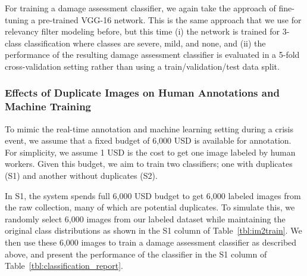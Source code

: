 \documentclass{iscram}
\begin{document}
For training a damage assessment classifier, we again take the approach of fine-tuning a pre-trained VGG-16 network. This is the same approach that we use for relevancy filter modeling before, but this time (i) the network is trained for 3-class classification where classes are severe, mild, and none, and (ii) the performance of the resulting damage assessment classifier is evaluated in a 5-fold cross-validation setting rather than using a train/validation/test data split.

\subsubsection{Effects of Duplicate Images on Human Annotations and Machine Training}%
To mimic the real-time annotation and machine learning setting during a crisis event, we assume that a fixed budget of 6,000 USD is available for annotation. For simplicity, we assume 1 USD is the cost to get one image labeled by human workers. Given this budget, we aim to train two classifiers; one with duplicates (S1) and another without duplicates (S2).

In S1, the system spends full 6,000 USD budget to get 6,000 labeled images from the raw collection, many of which are potential duplicates. 
To simulate this, we randomly select 6,000 images from our labeled dataset while maintaining the original class distributions as shown in the S1 column of Table~\ref{tbl:im2train}. We then use these 6,000 images to train a damage assessment classifier as described above, and present the performance of the classifier in the S1 column of Table~\ref{tbl:classification_report}. 
\end{document}
